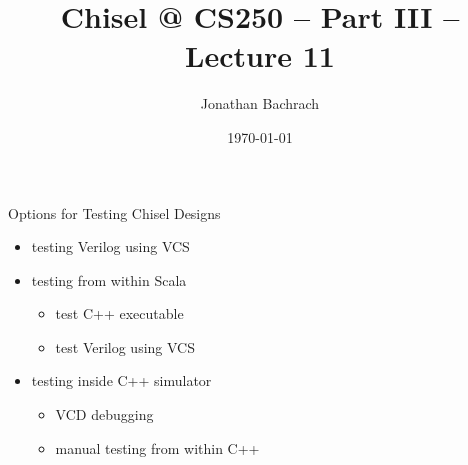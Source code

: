 \documentclass[xcolor=pdflatex,dvipsnames,table]{beamer}
\title{Chisel @ CS250 -- Part III -- Lecture 11}
\author{Jonathan Bachrach}
\date{\today}
\institute[UC Berkeley]{EECS UC Berkeley}
\begin{document}
\begin{frame}
\titlepage
\end{frame}
\addtocounter{framenumber}{-1}

% 
% 
% 

\begin{frame}{Options for Testing Chisel Designs}
\begin{itemize}
\item testing Verilog using VCS
\item testing from within Scala
\begin{itemize}
\item test C++ executable
\item test Verilog using VCS
\end{itemize}
\item testing inside C++ simulator
\begin{itemize}
\item VCD debugging
\item manual testing from within C++
\end{itemize}
\end{itemize}
\end{frame}
\end{document}
